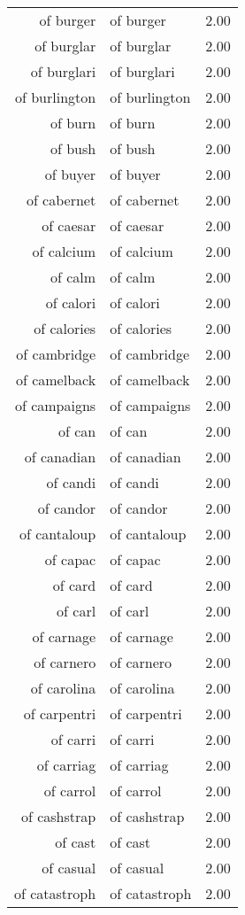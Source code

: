 \begin{table}[ht]
\begin{tabular}{rlr}
  of burger & of burger & 2.00 \\ 
  of burglar & of burglar & 2.00 \\ 
  of burglari & of burglari & 2.00 \\ 
  of burlington & of burlington & 2.00 \\ 
  of burn & of burn & 2.00 \\ 
  of bush & of bush & 2.00 \\ 
  of buyer & of buyer & 2.00 \\ 
  of cabernet & of cabernet & 2.00 \\ 
  of caesar & of caesar & 2.00 \\ 
  of calcium & of calcium & 2.00 \\ 
  of calm & of calm & 2.00 \\ 
  of calori & of calori & 2.00 \\ 
  of calories & of calories & 2.00 \\ 
  of cambridge & of cambridge & 2.00 \\ 
  of camelback & of camelback & 2.00 \\ 
  of campaigns & of campaigns & 2.00 \\ 
  of can & of can & 2.00 \\ 
  of canadian & of canadian & 2.00 \\ 
  of candi & of candi & 2.00 \\ 
  of candor & of candor & 2.00 \\ 
  of cantaloup & of cantaloup & 2.00 \\ 
  of capac & of capac & 2.00 \\ 
  of card & of card & 2.00 \\ 
  of carl & of carl & 2.00 \\ 
  of carnage & of carnage & 2.00 \\ 
  of carnero & of carnero & 2.00 \\ 
  of carolina & of carolina & 2.00 \\ 
  of carpentri & of carpentri & 2.00 \\ 
  of carri & of carri & 2.00 \\ 
  of carriag & of carriag & 2.00 \\ 
  of carrol & of carrol & 2.00 \\ 
  of cashstrap & of cashstrap & 2.00 \\ 
  of cast & of cast & 2.00 \\ 
  of casual & of casual & 2.00 \\ 
  of catastroph & of catastroph & 2.00 \\ 

\end{tabular}
\end{table}
